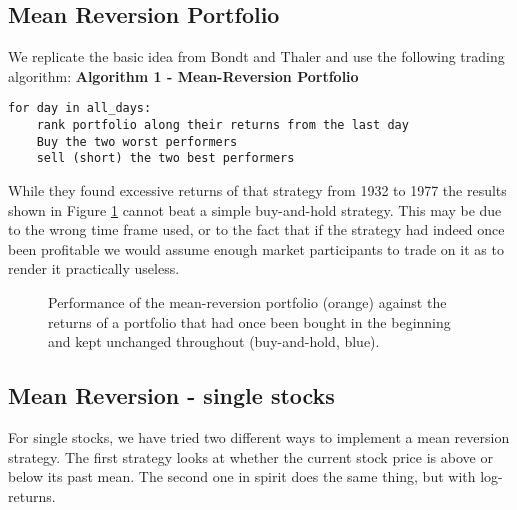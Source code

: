\subsection{Mean Reversion Portfolio}
We replicate the basic idea from Bondt and Thaler \citet{bondt_does_1985} and use the following trading algorithm: 
\vspace{2ex}
\textbf{\small{Algorithm 1 - Mean-Reversion Portfolio}}
\vspace{-1ex}
\begin{verbatim}
for day in all_days: 
    rank portfolio along their returns from the last day
    Buy the two worst performers
    sell (short) the two best performers
\end{verbatim}

While they found excessive returns of that strategy from 1932 to 1977 the results shown in Figure \ref{fig:mean reversion} cannot beat a simple buy-and-hold strategy. This may be due to the wrong time frame used, or to the fact that if the strategy had indeed once been profitable we would assume enough market participants to trade on it as to render it practically useless. 


\begin{figure}[h!]
    \centering
    \begin{adjustbox}{width=.95\textwidth,center}
        
    \end{adjustbox}  
    \caption{Performance of the mean-reversion portfolio (orange) against the returns of a portfolio that had once been bought in the beginning and kept unchanged throughout (buy-and-hold, blue).}
    \label{fig:mean reversion}
\end{figure}{}

\subsection{Mean Reversion - single stocks}
For single stocks, we have tried two different ways to implement a mean reversion strategy. The first strategy looks at whether the current stock price is above or below its past mean. The second one in spirit does the same thing, but with log-returns. 

